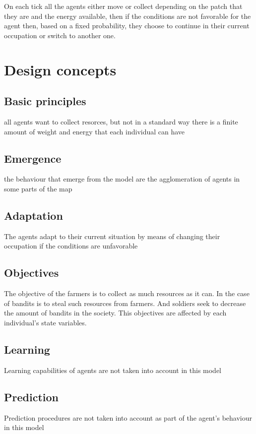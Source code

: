 \documentclass{article}
\begin{document}
On each tick all the agents either move or collect depending on the patch that
they are and the energy available, then if the conditions are not favorable for
the agent then, based on a fixed probability, they choose to continue in their
current occupation or switch to another one.

\section{Design concepts}

\subsection{Basic principles}
all agents want to collect resorces, but not in a standard way
there is a finite amount of weight and energy that each individual can have

\subsection{Emergence}
the behaviour that emerge from the model are the agglomeration of agents
in some parts of the map

\subsection{Adaptation}
The agents adapt to their current situation by means of changing their
occupation if the conditions are unfavorable

\subsection{Objectives}
The objective of the farmers is to collect as much resources as it can. In the
case of bandits is to steal such resources from farmers. And soldiers seek to
decrease the amount of bandits in the society. This objectives are affected by
each individual's state variables.

\subsection{Learning}
Learning capabilities of agents are not taken into account in this model

\subsection{Prediction}
Prediction procedures are not taken into account as part of the agent's behaviour
in this model
\end{document}

